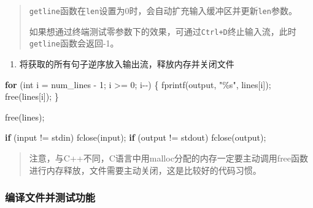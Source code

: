 \documentclass[
]{article}
\newenvironment{Shaded}{}{}
\newcommand{\ControlFlowTok}[1]{\textcolor[rgb]{0.00,0.44,0.13}{\textbf{#1}}}
\newcommand{\DataTypeTok}[1]{\textcolor[rgb]{0.56,0.13,0.00}{#1}}
\newcommand{\DecValTok}[1]{\textcolor[rgb]{0.25,0.63,0.44}{#1}}
\newcommand{\NormalTok}[1]{#1}
\newcommand{\OperatorTok}[1]{\textcolor[rgb]{0.40,0.40,0.40}{#1}}
\newcommand{\SpecialCharTok}[1]{\textcolor[rgb]{0.25,0.44,0.63}{#1}}
\newcommand{\StringTok}[1]{\textcolor[rgb]{0.25,0.44,0.63}{#1}}
\begin{document}
\begin{quote}
	\texttt{getline}函数在\texttt{len}设置为0时，会自动扩充输入缓冲区并更新\texttt{len}参数。

	如果想通过终端测试零参数下的效果，可通过\texttt{Ctrl+D}终止输入流，此时\texttt{getline}函数会返回-1。
\end{quote}

\begin{enumerate}[resume]
	\def\labelenumi{\arabic{enumi}.}
	\item
	      将获取的所有句子逆序放入输出流，释放内存并关闭文件
\end{enumerate}

\begin{Shaded}
	\begin{Highlighting}[]
		\ControlFlowTok{for} \OperatorTok{(}\DataTypeTok{int}\NormalTok{ i }\OperatorTok{=}\NormalTok{ num\_lines }\OperatorTok{{-}} \DecValTok{1}\OperatorTok{;}\NormalTok{ i }\OperatorTok{\textgreater{}=} \DecValTok{0}\OperatorTok{;}\NormalTok{ i}\OperatorTok{{-}{-})} \OperatorTok{\{}
		\NormalTok{    fprintf}\OperatorTok{(}\NormalTok{output}\OperatorTok{,} \StringTok{"}\SpecialCharTok{\%s}\StringTok{"}\OperatorTok{,}\NormalTok{ lines}\OperatorTok{[}\NormalTok{i}\OperatorTok{]);}
		\NormalTok{    free}\OperatorTok{(}\NormalTok{lines}\OperatorTok{[}\NormalTok{i}\OperatorTok{]);}
		\OperatorTok{\}}

		\NormalTok{free}\OperatorTok{(}\NormalTok{lines}\OperatorTok{);}

		\ControlFlowTok{if} \OperatorTok{(}\NormalTok{input }\OperatorTok{!=}\NormalTok{ stdin}\OperatorTok{)}
		\NormalTok{    fclose}\OperatorTok{(}\NormalTok{input}\OperatorTok{);}
		\ControlFlowTok{if} \OperatorTok{(}\NormalTok{output }\OperatorTok{!=}\NormalTok{ stdout}\OperatorTok{)}
		\NormalTok{    fclose}\OperatorTok{(}\NormalTok{output}\OperatorTok{);}
	\end{Highlighting}
\end{Shaded}

\begin{quote}
	注意，与C++不同，C语言中用malloc分配的内存一定要主动调用free函数进行内存释放，文件需要主动关闭，这是比较好的代码习惯。
\end{quote}

\subsubsection{编译文件并测试功能}\label{ux7f16ux8bd1ux6587ux4ef6ux5e76ux6d4bux8bd5ux529fux80fd}
\end{document}
